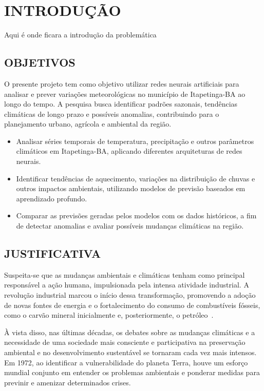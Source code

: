 \chapter{INTRODUÇÃO}

Aqui é onde ficara a introdução da problemática

\section{OBJETIVOS}
    O presente projeto tem como objetivo utilizar redes neurais artificiais para analisar e prever 
    variações meteorológicas no município de Itapetinga-BA ao longo do tempo. A pesquisa busca 
    identificar padrões sazonais, tendências climáticas de longo prazo e possíveis anomalias, 
    contribuindo para o planejamento urbano, agrícola e ambiental da região.

    \begin{itemize}
        \item Analisar séries temporais de temperatura, precipitação e outros parâmetros climáticos 
        em Itapetinga-BA, aplicando diferentes arquiteturas de redes neurais.
        \item Identificar tendências de aquecimento, variações na distribuição de chuvas e outros 
        impactos ambientais, utilizando modelos de previsão baseados em aprendizado profundo.
        \item Comparar as previsões geradas pelos modelos com os dados históricos, a fim de 
        detectar anomalias e avaliar possíveis mudanças climáticas na região.
    \end{itemize}

\section{JUSTIFICATIVA}
    Suspeita-se que as mudanças ambientais e climáticas tenham como principal responsável a ação humana, 
    impulsionada pela intensa atividade industrial. A revolução industrial marcou o início dessa transformação, 
    promovendo a adoção de novas fontes de energia e o fortalecimento do consumo de combustíveis fósseis, como o 
    carvão mineral inicialmente e, posteriormente, o petróleo~\cite{mendoncca2006aquecimento}.
    
    À vista disso, nas últimas décadas, os debates sobre as mudanças climáticas e a necessidade de uma sociedade 
    mais consciente e participativa na preservação ambiental e no desenvolvimento sustentável se tornaram cada 
    vez mais intensos. Em 1972, ao identificar a vulnerabilidade do planeta Terra, houve um esforço mundial conjunto
    em entender os problemas ambientais e ponderar medidas para previnir e amenizar determinados crises.
    
